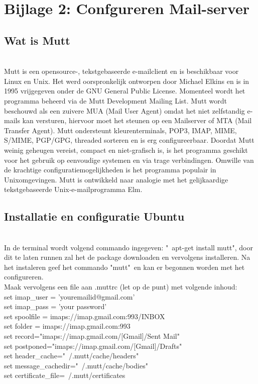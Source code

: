 \label{Bijlage 2}

\appendix
\section{Bijlage 2: Confgureren Mail-server}

\subsection*{Wat is Mutt}\ \\

Mutt is een opensource-, tekstgebaseerde e-mailclient en is beschikbaar voor Linux en Unix. Het werd oorspronkelijk ontworpen door Michael Elkins en is in 1995 vrijgegeven onder de GNU General Public License. Momenteel wordt het programma beheerd via de Mutt Development Mailing List. Mutt wordt beschouwd als een zuivere MUA (Mail User Agent) omdat het niet zelfstandig e-mails kan versturen, hiervoor moet het steunen op een Mailserver of MTA (Mail Transfer Agent). Mutt ondersteunt kleurenterminals, POP3, IMAP, MIME, S/MIME, PGP/GPG, threaded sorteren en is erg configureerbaar. Doordat Mutt weinig geheugen vereist, compact en niet-grafisch is, is het programma geschikt voor het gebruik op eenvoudige systemen en via trage verbindingen. Omwille van de krachtige configuratiemogelijkheden is het programma populair in Unixomgevingen. Mutt is ontwikkeld naar analogie met het gelijkaardige tekstgebaseerde Unix-e-mailprogramma Elm.\\

\subsection*{Installatie en configuratie Ubuntu}\ \\

In de terminal wordt volgend commando ingegeven: "\ apt-get install mutt", door dit te laten runnen zal het de package downloaden en vervolgens installeren. Na het instaleren geef het commando "mutt"\  en kan er begonnen worden met het configureren.\\

Maak vervolgens een file aan .muttrc (let op de punt) met volgende inhoud:\\
set imap\_user = 'youremailid@gmail.com'\\
set imap\_pass = 'your password'\\
set spoolfile = imaps://imap.gmail.com:993/INBOX\\
set folder = imaps://imap.gmail.com:993\\
set record="imaps://imap.gmail.com/[Gmail]/Sent Mail"\\
set postponed="imaps://imap.gmail.com/[Gmail]/Drafts"\\
set header\_cache="~/.mutt/cache/headers"\\
set message\_cachedir="~/.mutt/cache/bodies"\\
set certificate\_file=~/.mutt/certificates\\